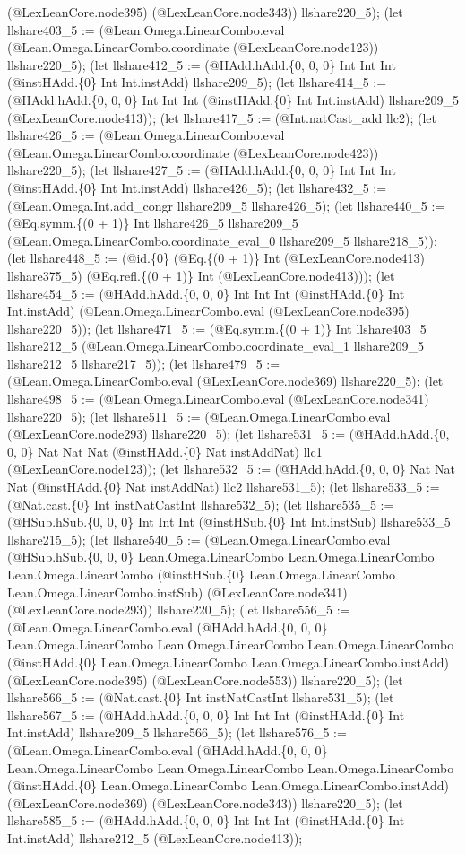 \documentclass[11pt]{article}
\begin{document}
(@LexLeanCore.node395) (@LexLeanCore.node343)) llshare220\_5); (let llshare403\_5 := (@Lean.Omega.LinearCombo.eval (@Lean.Omega.LinearCombo.coordinate (@LexLeanCore.node123)) llshare220\_5); (let llshare412\_5 := (@HAdd.hAdd.\{0, 0, 0\} Int Int Int (@instHAdd.\{0\} Int Int.instAdd) llshare209\_5); (let llshare414\_5 := (@HAdd.hAdd.\{0, 0, 0\} Int Int Int (@instHAdd.\{0\} Int Int.instAdd) llshare209\_5 (@LexLeanCore.node413)); (let llshare417\_5 := (@Int.natCast\_add llc2); (let llshare426\_5 := (@Lean.Omega.LinearCombo.eval (@Lean.Omega.LinearCombo.coordinate (@LexLeanCore.node423)) llshare220\_5); (let llshare427\_5 := (@HAdd.hAdd.\{0, 0, 0\} Int Int Int (@instHAdd.\{0\} Int Int.instAdd) llshare426\_5); (let llshare432\_5 := (@Lean.Omega.Int.add\_congr llshare209\_5 llshare426\_5); (let llshare440\_5 := (@Eq.symm.\{(0 + 1)\} Int llshare426\_5 llshare209\_5 (@Lean.Omega.LinearCombo.coordinate\_eval\_0 llshare209\_5 llshare218\_5)); (let llshare448\_5 := (@id.\{0\} (@Eq.\{(0 + 1)\} Int (@LexLeanCore.node413) llshare375\_5) (@Eq.refl.\{(0 + 1)\} Int (@LexLeanCore.node413))); (let llshare454\_5 := (@HAdd.hAdd.\{0, 0, 0\} Int Int Int (@instHAdd.\{0\} Int Int.instAdd) (@Lean.Omega.LinearCombo.eval (@LexLeanCore.node395) llshare220\_5)); (let llshare471\_5 := (@Eq.symm.\{(0 + 1)\} Int llshare403\_5 llshare212\_5 (@Lean.Omega.LinearCombo.coordinate\_eval\_1 llshare209\_5 llshare212\_5 llshare217\_5)); (let llshare479\_5 := (@Lean.Omega.LinearCombo.eval (@LexLeanCore.node369) llshare220\_5); (let llshare498\_5 := (@Lean.Omega.LinearCombo.eval (@LexLeanCore.node341) llshare220\_5); (let llshare511\_5 := (@Lean.Omega.LinearCombo.eval (@LexLeanCore.node293) llshare220\_5); (let llshare531\_5 := (@HAdd.hAdd.\{0, 0, 0\} Nat Nat Nat (@instHAdd.\{0\} Nat instAddNat) llc1 (@LexLeanCore.node123)); (let llshare532\_5 := (@HAdd.hAdd.\{0, 0, 0\} Nat Nat Nat (@instHAdd.\{0\} Nat instAddNat) llc2 llshare531\_5); (let llshare533\_5 := (@Nat.cast.\{0\} Int instNatCastInt llshare532\_5); (let llshare535\_5 := (@HSub.hSub.\{0, 0, 0\} Int Int Int (@instHSub.\{0\} Int Int.instSub) llshare533\_5 llshare215\_5); (let llshare540\_5 := (@Lean.Omega.LinearCombo.eval (@HSub.hSub.\{0, 0, 0\} Lean.Omega.LinearCombo Lean.Omega.LinearCombo Lean.Omega.LinearCombo (@instHSub.\{0\} Lean.Omega.LinearCombo Lean.Omega.LinearCombo.instSub) (@LexLeanCore.node341) (@LexLeanCore.node293)) llshare220\_5); (let llshare556\_5 := (@Lean.Omega.LinearCombo.eval (@HAdd.hAdd.\{0, 0, 0\} Lean.Omega.LinearCombo Lean.Omega.LinearCombo Lean.Omega.LinearCombo (@instHAdd.\{0\} Lean.Omega.LinearCombo Lean.Omega.LinearCombo.instAdd) (@LexLeanCore.node395) (@LexLeanCore.node553)) llshare220\_5); (let llshare566\_5 := (@Nat.cast.\{0\} Int instNatCastInt llshare531\_5); (let llshare567\_5 := (@HAdd.hAdd.\{0, 0, 0\} Int Int Int (@instHAdd.\{0\} Int Int.instAdd) llshare209\_5 llshare566\_5); (let llshare576\_5 := (@Lean.Omega.LinearCombo.eval (@HAdd.hAdd.\{0, 0, 0\} Lean.Omega.LinearCombo Lean.Omega.LinearCombo Lean.Omega.LinearCombo (@instHAdd.\{0\} Lean.Omega.LinearCombo Lean.Omega.LinearCombo.instAdd) (@LexLeanCore.node369) (@LexLeanCore.node343)) llshare220\_5); (let llshare585\_5 := (@HAdd.hAdd.\{0, 0, 0\} Int Int Int (@instHAdd.\{0\} Int Int.instAdd) llshare212\_5 (@LexLeanCore.node413)); 
\end{document}
